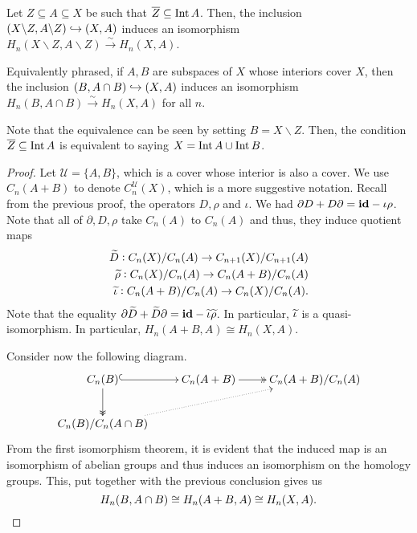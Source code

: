 \begin{theorem}
    Let $Z\subseteq A\subseteq X$ be such that $\overline Z\subseteq\operatorname{Int} A$. Then, the inclusion $(X\backslash Z, A\backslash Z)\hookrightarrow(X, A)$ induces an isomorphism $H_n(X\backslash Z, A\backslash Z)\stackrel{\sim}{\longrightarrow}H_n(X, A)$.

    Equivalently phrased, if $A, B$ are subspaces of $X$ whose interiors cover $X$, then the inclusion $(B, A\cap B)\hookrightarrow (X, A)$ induces an isomorphism $H_n(B, A\cap B)\stackrel{\sim}{\longrightarrow} H_n(X, A)$ for all $n$.
\end{theorem}
Note that the equivalence can be seen by setting $B = X\backslash Z$. Then, the condition $\overline Z\subseteq\operatorname{Int} A$ is equivalent to saying $X = \operatorname{Int} A\cup\operatorname{Int} B$.
\begin{proof}
    Let $\mathscr U = \{A, B\}$, which is a cover whose interior is also a cover. We use $C_n(A + B)$ to denote $C_n^{\mathscr U}(X)$, which is a more suggestive notation. Recall from the previous proof, the operators $D, \rho$ and $\iota$. We had $\partial D + D\partial = \mathbf{id} - \iota\rho$. Note that all of $\partial, D, \rho$ take $C_n(A)$ to $C_n(A)$ and thus, they induce quotient maps 
    \begin{align*}
        \widetilde{D}: C_n(X)/C_n(A)\to C_{n + 1}(X)/C_{n + 1}(A)\\
        \widetilde{\rho}: C_n(X)/C_n(A)\to C_n(A + B)/C_n(A)\\
        \widetilde{\iota}: C_n(A + B)/C_n(A)\to C_n(X)/C_n(A).
    \end{align*}
    Note that the equality $\partial\widetilde{D} + \widetilde{D}\partial = \mathbf{id} - \widetilde{\iota}\widetilde{\rho}$. In particular, $\widetilde{\iota}$ is a quasi-isomorphism. In particular, $H_n(A + B, A)\cong H_n(X, A)$.

    Consider now the following diagram.
    \begin{equation*}
        \xymatrix {
            C_n(B)\ar@{^{(}->}[r]\ar@{->>}[d] & C_n(A + B)\ar@{->>}[r] & C_n(A + B)/C_n(A)\\
            C_n(B)/C_n(A\cap B)\ar@{.>}[rru]
        }
    \end{equation*}
    From the first isomorphism theorem, it is evident that the induced map is an isomorphism of abelian groups and thus induces an isomorphism on the homology groups. This, put together with the previous conclusion gives us 
    \begin{equation*}
        H_n(B, A\cap B)\cong H_n(A + B, A)\cong H_n(X, A).\qedhere
    \end{equation*}
\end{proof}


